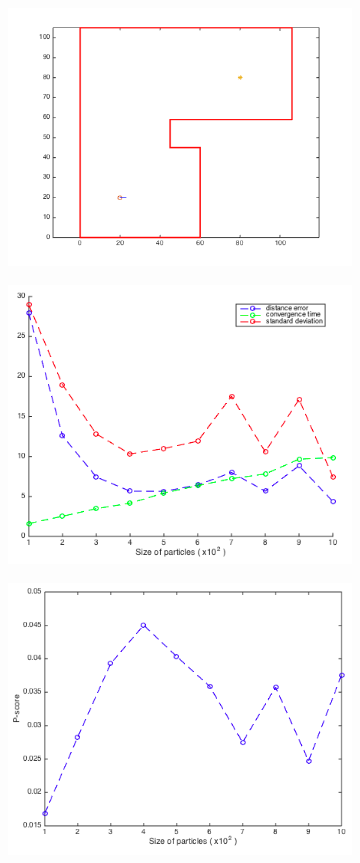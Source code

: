 \documentclass[12pt]{article}
\begin{document}
\begin{figure}[h]
\centering
  \begin{subfigure}{0.48\textwidth}
  \includegraphics[scale=0.5]{experiment}
  \caption{}
  \label{fig:experiment}
  \end{subfigure}
  \begin{subfigure}{0.48\textwidth}
  \includegraphics[scale=0.5]{sizedetermine}
  \caption{}
  \label{fig:sizedeter}
  \end{subfigure}
  \begin{subfigure}{0.48\textwidth}
  \includegraphics[scale=0.5]{scorecompute}

\end{subfigure}
\end{figure}
\end{document}
